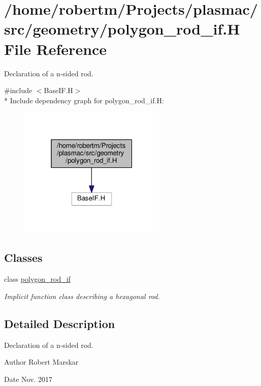 \hypertarget{polygon__rod__if_8H}{}\section{/home/robertm/\+Projects/plasmac/src/geometry/polygon\+\_\+rod\+\_\+if.H File Reference}
\label{polygon__rod__if_8H}


Declaration of a n-\/sided rod.  


{\ttfamily \#include $<$Base\+I\+F.\+H$>$}\\*
Include dependency graph for polygon\+\_\+rod\+\_\+if.\+H\+:\nopagebreak
\begin{figure}[H]
\begin{center}
\leavevmode
\includegraphics[width=199pt]{polygon__rod__if_8H__incl}
\end{center}
\end{figure}
\subsection*{Classes}
\begin{DoxyCompactItemize}
\item 
class \hyperlink{classpolygon__rod__if}{polygon\+\_\+rod\+\_\+if}
\begin{DoxyCompactList}\small\item\em Implicit function class describing a hexagonal rod. \end{DoxyCompactList}\end{DoxyCompactItemize}


\subsection{Detailed Description}
Declaration of a n-\/sided rod. 

\begin{DoxyAuthor}{Author}
Robert Marskar 
\end{DoxyAuthor}
\begin{DoxyDate}{Date}
Nov. 2017 
\end{DoxyDate}
